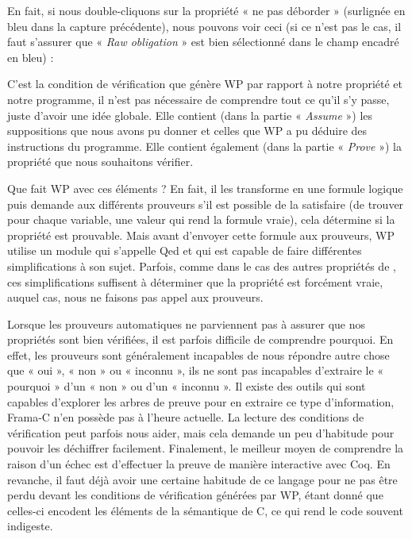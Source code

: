 En fait, si nous double-cliquons sur la
propriété « ne pas déborder » (surlignée en bleu dans la capture précédente),
nous pouvons voir ceci (si ce n'est pas le cas, il faut s'assurer que
« \textit{Raw obligation} » est bien sélectionné dans le champ encadré en bleu) :





C'est la condition de vérification que génère WP par rapport à notre propriété et
notre programme, il n'est pas nécessaire de comprendre tout ce qu'il s'y passe,
juste d'avoir une idée globale. Elle contient (dans la partie « \textit{Assume} ») les
suppositions que nous avons pu donner et celles que WP a pu déduire des
instructions du programme. Elle contient également (dans la partie « \textit{Prove} »)
la propriété que nous souhaitons vérifier.



Que fait WP avec ces éléments ? En fait, il les transforme en une formule
logique puis demande aux différents prouveurs s'il est possible de la
satisfaire (de trouver pour chaque variable, une valeur qui rend la formule
vraie), cela détermine si la propriété est prouvable. Mais avant d'envoyer
cette formule aux prouveurs, WP utilise un module qui s'appelle Qed et qui est
capable de faire différentes simplifications à son sujet. Parfois, comme dans
le cas des autres propriétés de , ces simplifications suffisent à
déterminer que la propriété est forcément vraie, auquel cas, nous ne faisons
pas appel aux prouveurs.



Lorsque les prouveurs automatiques ne parviennent pas à assurer que nos
propriétés sont bien vérifiées, il est parfois difficile de comprendre
pourquoi. En effet, les prouveurs sont généralement incapables de nous
répondre autre chose que « oui », « non » ou « inconnu », ils ne sont pas
incapables d'extraire le « pourquoi » d'un « non » ou d'un « inconnu ». Il
existe des outils qui
sont capables d'explorer les arbres de preuve pour en extraire ce type
d'information, Frama-C n'en possède pas à l'heure actuelle. La lecture des
conditions de vérification peut parfois nous aider, mais cela demande un peu
d'habitude pour pouvoir les déchiffrer facilement. Finalement, le meilleur
moyen de comprendre la raison d'un échec est d'effectuer la preuve de manière
interactive avec Coq. En revanche, il faut déjà avoir une certaine habitude de
ce langage pour ne pas être perdu devant les conditions de vérification générées par
WP, étant donné que celles-ci encodent les éléments de la sémantique de C, ce
qui rend le code souvent indigeste.



